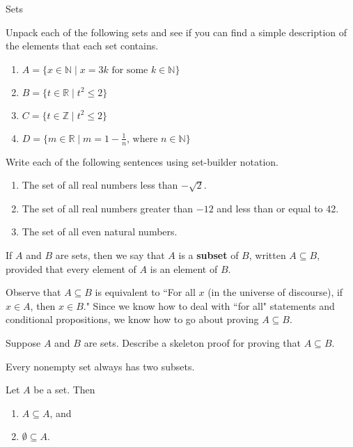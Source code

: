 \begin{section}{Sets}
\begin{problem}
Unpack each of the following sets and see if you can find a simple description of the elements that each set contains.
\begin{enumerate}[label=\textrm{(\alph*)}]
\item $A=\{x \in \mathbb{N} \mid x = 3k \mbox{ for some } k\in \mathbb{N} \}$
\item $B=\{t \in \mathbb{R} \mid t^2 \leq 2 \}$
\item $C=\{t \in \mathbb{Z} \mid t^2 \leq 2 \}$
\item $D=\{m \in \mathbb{R} \mid m = 1 - \frac{1}{n} \mbox{, where } n \in \mathbb{N} \}$
\end{enumerate}
\end{problem}

\begin{problem}
Write each of the following sentences using set-builder notation.
\begin{enumerate}[label=\textrm{(\alph*)}]
\item The set of all real numbers less than $-\sqrt{2}$. 
\item The set of all real numbers greater than $-12$ and less than or equal to 42.
\item The set of all even natural numbers.
\end{enumerate}
\end{problem}

\begin{definition}
If $A$ and $B$ are sets, then we say that $A$ is a \textbf{subset} of $B$, written $\boxed{A\subseteq B}$, provided that every element of $A$ is an element of $B$.
\end{definition}

Observe that $A\subseteq B$ is equivalent to ``For all $x$ (in the universe of discourse), if $x\in A$, then $x\in B$."  Since we know how to deal with ``for all" statements and conditional propositions, we know how to go about proving $A\subseteq B$.

\begin{problem}
Suppose $A$ and $B$ are sets.  Describe a skeleton proof for proving that $A\subseteq B$.
\end{problem}

Every nonempty set always has two subsets.

\begin{theorem}
Let $A$ be a set.  Then
\begin{enumerate}[label=\textrm{(\alph*)}]
\item $A\subseteq A$, and
\item $\emptyset \subseteq A$.
\end{enumerate}
\end{theorem}


\end{section}
